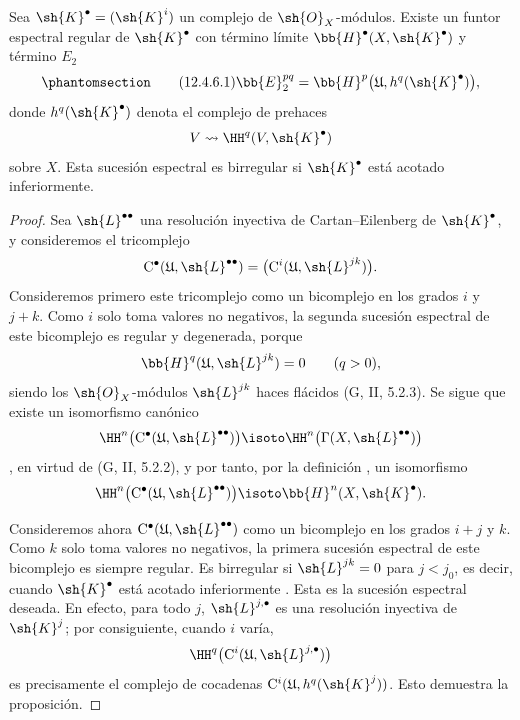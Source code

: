 \documentclass[oneside]{amsart}
\newcommand{\oldpage}[2][]{{\marginnote{\normalfont\textbf{#1}~|~#2}}\ignorespaces}
\let\EGAOriginalLabel\label
\renewcommand{\label}[1]{\phantomsection\EGAOriginalLabel{#1}}
\begin{document}
\begin{proposition}[12.4.6]
\label{0.12.4.6}
Sea $\sh{K}^\bullet=(\sh{K}^i)$ un complejo de
$\sh{O}_X$-módulos.
Existe un funtor espectral regular de $\sh{K}^\bullet$ con
término límite $\bb{H}^\bullet(X,\sh{K}^\bullet)$ y término $E_2$
\begin{equation}
\label{0.12.4.6.1}
\tag{12.4.6.1}
  \bb{E}_2^{pq}
  =
  \bb{H}^p\bigl(\mathfrak{U},h^q(\sh{K}^\bullet)\bigr),
\end{equation}
donde $h^q(\sh{K}^\bullet)$ denota el complejo de prehaces
\[
  V\leadsto\HH^q(V,\sh{K}^\bullet)
\]
sobre $X$.
Esta sucesión espectral es birregular si $\sh{K}^\bullet$ está acotado
inferiormente.
\end{proposition}

\begin{proof}
Sea $\sh{L}^{\bullet\bullet}$ una resolución inyectiva de
Cartan--Eilenberg de $\sh{K}^\bullet$, y consideremos el tricomplejo
\[
  \mathrm{C}^\bullet
  (\mathfrak{U},\sh{L}^{\bullet\bullet})
  =
  \bigl(\mathrm{C}^i
    (\mathfrak{U},\sh{L}^{jk})\bigr).
\]
Consideremos primero este tricomplejo como un bicomplejo en los grados $i$ y
$j+k$.
Como $i$ solo toma valores no negativos, la segunda sucesión espectral
de este bicomplejo es regular  y degenerada, porque
\[
  \bb{H}^q(\mathfrak{U},\sh{L}^{jk})=0
  \qquad(q>0),
\]
siendo los $\sh{O}_X$-módulos $\sh{L}^{jk}$ haces flácidos
\oldpage[0\textsubscript{III}]{64}
(G, II, 5.2.3).
Se sigue que existe un isomorfismo canónico
\[
  \HH^n\bigl(
    \mathrm{C}^\bullet
      (\mathfrak{U},\sh{L}^{\bullet\bullet})
  \bigr)
  \isoto
  \HH^n\bigl(\Gamma(X,\sh{L}^{\bullet\bullet})\bigr)
\]
, en virtud de (G, II, 5.2.2), y por tanto, por la
definición , un isomorfismo
\[
  \HH^n\bigl(
    \mathrm{C}^\bullet
      (\mathfrak{U},\sh{L}^{\bullet\bullet})
  \bigr)
  \isoto
  \bb{H}^n(X,\sh{K}^\bullet).
\]

Consideremos ahora
$\mathrm{C}^\bullet
(\mathfrak{U},\sh{L}^{\bullet\bullet})$
como un bicomplejo en los grados $i+j$ y $k$.
Como $k$ solo toma valores no negativos, la primera sucesión espectral
de este bicomplejo es siempre regular.
Es birregular si $\sh{L}^{jk}=0$ para $j<j_0$, es decir, cuando
$\sh{K}^\bullet$ está acotado inferiormente .
Esta es la sucesión espectral deseada.
En efecto, para todo $j$, $\sh{L}^{j,\bullet}$ es una resolución
inyectiva de $\sh{K}^j$; por consiguiente, cuando $i$ varía,
\[
  \HH^q\bigl(
    \mathrm{C}^i
      (\mathfrak{U},\sh{L}^{j,\bullet})
  \bigr)
\]
es precisamente el complejo de cocadenas
$\mathrm{C}^i(\mathfrak{U},h^q(\sh{K}^j))$.
Esto demuestra la proposición.
\end{proof}
\end{document}
